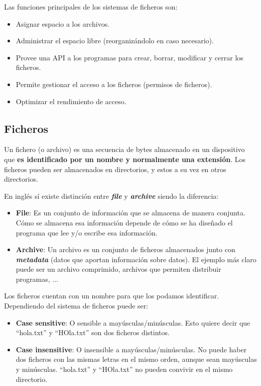 Las funciones principales de los sistemas de ficheros son:

\begin{itemize}
    \item Asignar espacio a los archivos.
    \item Administrar el espacio libre (reorganizándolo en caso necesario).
    \item Provee una API a los programas para crear, borrar, modificar y cerrar los ficheros.
    \item Permite gestionar el acceso a los ficheros (permisos de ficheros).
    \item Optimizar el rendimiento de acceso.
\end{itemize}


\subsection{Ficheros}
Un fichero (o archivo) es una secuencia de bytes almacenado en un dispositivo que \textbf{es identificado por un nombre y normalmente una extensión}. Los ficheros pueden ser almacenados en directorios, y estos a su vez en otros directorios.

En inglés sí existe distinción entre \textbf{\textit{file}} y \textbf{\textit{archive}} siendo la diferencia:

\begin{itemize}
    \item \textbf{File}: Es un conjunto de información que se almacena de manera conjunta. Cómo se almacena esa información depende de cómo se ha diseñado el programa que lee y/o escribe esa información.
    \item \textbf{Archive}: Un archivo es un conjunto de ficheros almacenados junto con \textit{\textbf{metadata}} (datos que aportan información sobre datos). El ejemplo más claro puede ser un archivo comprimido, archivos que permiten distribuir programas, ...
\end{itemize}

Los ficheros cuentan con un nombre para que los podamos identificar. Dependiendo del sistema de ficheros puede ser:
\begin{itemize}
    \item \textbf{Case sensitive}: O sensible a mayúsculas/minúsculas. Esto quiere decir que “hola.txt” y “HOla.txt” son dos ficheros distintos.
    \item \textbf{Case insensitive}: O insensible a mayúsculas/minúsculas. No puede haber dos ficheros con las mismas letras en el mismo orden, aunque sean mayúsculas y minúsculas. “hola.txt” y “HOla.txt” no pueden convivir en el mismo directorio.
\end{itemize}

